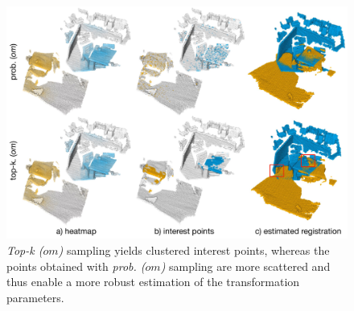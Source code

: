 \begin{figure}[t]
    \centering
    \includegraphics[width=\columnwidth]{figures/images/demo_sampling.pdf}
    \caption{\emph{Top-k ($om$)} sampling yields clustered interest points, whereas the points obtained with \emph{prob. ($om$)} sampling are more scattered and thus enable a more robust estimation of the transformation parameters.}
    \label{fig:sampling}
\end{figure}